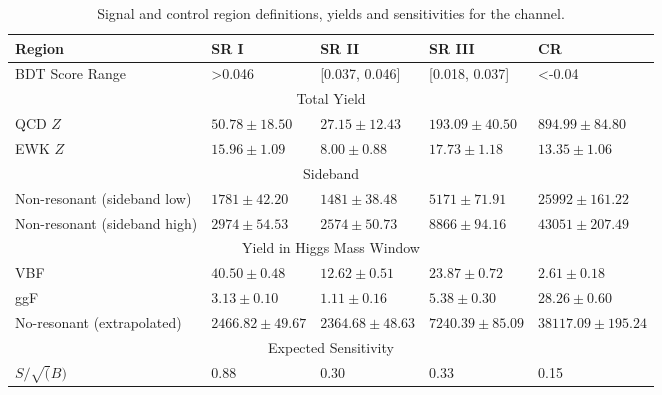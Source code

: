 \begin{table}[]
\centering
\caption{Signal and control region definitions, yields and sensitivities for the \twocentral channel. }
\label{tab:BDTReg2cen}
\begin{tabular}{|l|l|l|l|l|}
\hline
Region          & SR I               & SR II               & SR III             & CR                    \\ \hline
BDT Score Range & \textgreater0.046  & {[}0.037, 0.046{]}  & {[}0.018, 0.037{]} & \textless-0.04        \\ \hline
\multicolumn{5}{|c|}{Total Yield}                                                        \\ \hline
QCD $Z$ & $50.78 \pm 18.50$ & $27.15 \pm 12.43$ & $193.09 \pm 40.50$   &  $894.99 \pm 84.80$    \\ \cline{2-5} 
EWK $Z$&  $15.96 \pm 1.09$ &  $8.00 \pm 0.88$  & $17.73 \pm 1.18$  &  $13.35 \pm 1.06$    \\ \hline

\multicolumn{5}{|c|}{Sideband}  \\ \hline
Non-resonant (sideband low)     & $1781 \pm 42.20$  & $1481 \pm 38.48 $ & $5171 \pm 71.91$ & $25992 \pm 161.22$    \\ \cline{2-5} 
Non-resonant (sideband high)    & $2974 \pm 54.53$  & $2574 \pm 50.73 $ & $8866 \pm 94.16$ & $43051 \pm 207.49$    \\ \hline

\multicolumn{5}{|c|}{Yield in Higgs Mass Window}                                                        \\ \hline
VBF             & $40.50 \pm 0.48$   & $12.62\pm 0.51$     & $23.87\pm 0.72$    & $2.61 \pm 0.18$       \\ \cline{2-5} 
ggF             & $3.13 \pm 0.10$    & $1.11\pm 0.16$      & $5.38\pm 0.30$     & $28.26\pm 0.60$       \\ \cline{2-5}
No-resonant (extrapolated)    & $2466.82 \pm 49.67$ & $2364.68 \pm 48.63$ & $7240.39\pm 85.09$ & $38117.09 \pm 195.24$ \\ \hline
\multicolumn{5}{|c|}{Expected Sensitivity}                                                              \\ \hline
$S/ \sqrt(B)$   & 0.88               & 0.30                & 0.33               & 0.15                  \\ \hline
\end{tabular}
\end{table}


